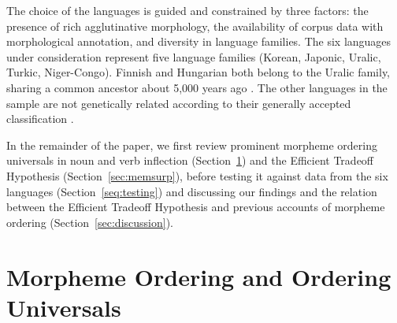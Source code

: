 \documentclass[man]{apa7}
\newcommand{\citep}{\parencite}
\begin{document}
The choice of the languages is guided and constrained by three factors: the presence of rich agglutinative morphology, the availability of corpus data with morphological annotation, and diversity in language families.
The six languages under consideration represent five language families (Korean, Japonic, Uralic, Turkic, Niger-Congo).
Finnish and Hungarian both belong to the Uralic family, sharing a common ancestor about 5,000 years ago \citep{maurits2020best}.
The other languages in the sample are not genetically related according to their generally accepted classification \citep{glottolog}.










In the remainder of the paper, we first review prominent morpheme ordering universals in noun and verb inflection (Section~\ref{sec:univ}) and the Efficient Tradeoff Hypothesis (Section~\ref{sec:memsurp}), before testing it against data from the six languages (Section~\ref{seq:testing}) and discussing our findings and the relation between the Efficient Tradeoff Hypothesis and previous accounts of morpheme ordering (Section~\ref{sec:discussion}).


\section{Morpheme Ordering and Ordering Universals}\label{sec:univ}
\end{document}
